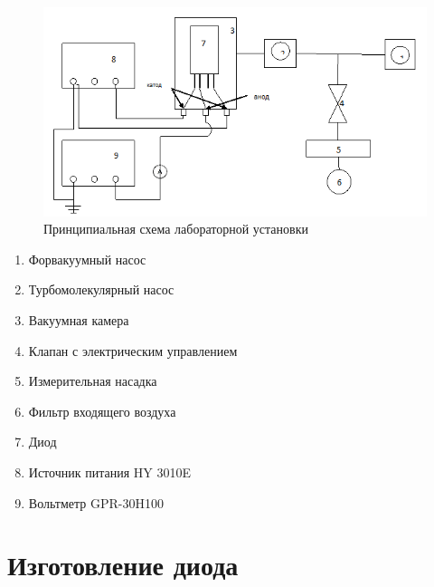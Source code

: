\documentclass[a4paper]{article}
\begin{document}
\begin{figure}[h]
    \centering
    \includegraphics[width=13cm]{setup.PNG}
    \caption{Принципиальная схема лабораторной установки}
    \label{fig:vac}
\end{figure}
\begin{enumerate}
    \item Форвакуумный насос
\item Турбомолекулярный насос
\item Вакуумная камера
\item Клапан с электрическим управлением
\item Измерительная насадка
\item Фильтр входящего воздуха
\item Диод
\item Источник питания HY 3010E
\item Вольтметр GPR-30H100
\end{enumerate}

\section{Изготовление диода}
\end{document}
